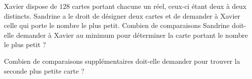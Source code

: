 Xavier dispose de $128$ cartes portant chacune un réel, ceux-ci étant deux à deux distincts. Sandrine a le droit de désigner deux cartes et de demander à Xavier celle qui porte le nombre le plus petit. Combien de comparaisons Sandrine doit-elle demander à Xavier au minimum pour déterminer la carte portant le nombre le plus petit ?

Combien de comparaisons supplémentaires doit-elle demander pour trouver la seconde plus petite carte ?
